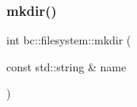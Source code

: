 \mbox{\label{namespacebc_1_1filesystem_acf4ffc2a67e4f6c120dd465d60515773}} 
\subsubsection{\texorpdfstring{mkdir()}{mkdir()}}
{\footnotesize\ttfamily int bc\+::filesystem\+::mkdir (\begin{DoxyParamCaption}\item[{const std\+::string \&}]{name }\end{DoxyParamCaption})\hspace{0.3cm}{\ttfamily [inline]}}

